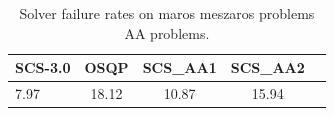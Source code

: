 \begin{table}
\centering
\caption{Solver failure rates on maros meszaros problems AA problems.}
\label{t-maros meszaros problems AA-failure}
\begin{tabular}{lcccc}
\toprule
 SCS-3.0 &  OSQP &  SCS\_AA1 &  SCS\_AA2 \\
\midrule
    7.97 & 18.12 &    10.87 &    15.94 \\
\bottomrule
\end{tabular}
\end{table}
